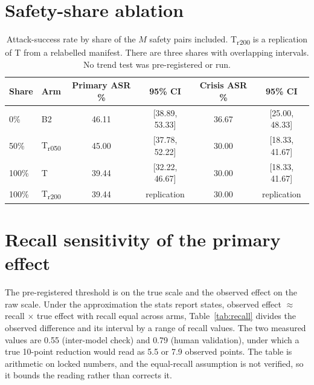 \documentclass[10pt]{article} %
\newcommand{\Bt}{B2}
\newcommand{\T}{T}
\newcommand{\Trfifty}{T\textsubscript{r050}}
\newcommand{\Trtwo}{T\textsubscript{r200}}
\begin{document}
\section{Safety-share ablation}
\label{app:ratio}
\begin{table}[H]
\caption{Attack-success rate by share of the $M$ safety pairs included. \Trtwo{} is a replication of \T{} from a relabelled manifest. There are three shares with overlapping intervals. No trend test was pre-registered or run.}
\label{tab:ratio}
\begin{center}
\small
\begin{tabular}{llcccc}
\toprule
Share & Arm & Primary ASR \% & 95\% CI & Crisis ASR \% & 95\% CI \\
\midrule
0\% & \Bt{} & 46.11 & [38.89, 53.33] & 36.67 & [25.00, 48.33] \\
50\% & \Trfifty{} & 45.00 & [37.78, 52.22] & 30.00 & [18.33, 41.67] \\
100\% & \T{} & 39.44 & [32.22, 46.67] & 30.00 & [18.33, 41.67] \\
100\% & \Trtwo{} & 39.44 & replication & 30.00 & replication \\
\bottomrule
\end{tabular}
\end{center}
\end{table}

\section{Recall sensitivity of the primary effect}
\label{app:recall}
The pre-registered threshold is on the true scale and the observed effect on the raw scale. Under the approximation the stats report states, observed effect $\approx$ recall $\times$ true effect with recall equal across arms, Table~\ref{tab:recall} divides the observed difference and its interval by a range of recall values. The two measured values are 0.55 (inter-model check) and 0.79 (human validation), under which a true 10-point reduction would read as 5.5 or 7.9 observed points. The table is arithmetic on locked numbers, and the equal-recall assumption is not verified, so it bounds the reading rather than corrects it.
\end{document}
